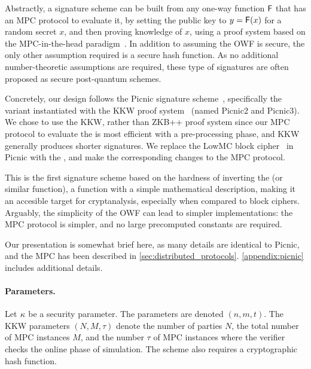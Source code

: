 Abstractly, a signature scheme can be built from any one-way function $\mathsf{F}$
that has an MPC protocol to evaluate it, by setting the public key to $y =
\mathsf{F}(x)$ for a random secret $x$, and then proving knowledge of $x$, using a
proof system based on the MPC-in-the-head paradigm~\cite{STOC:IKOS07}.  In
addition to assuming the OWF is secure, the only other assumption required is a
secure hash function. As no additional number-theoretic assumptions are
required, these type of signatures are often proposed as secure post-quantum
schemes. 

Concretely, our design follows the Picnic signature scheme~\cite{CCS:CDGORR17},
specifically the variant instantiated with the KKW proof
system~\cite{CCS:KatKolWan18} (named Picnic2 and Picnic3).  We chose to use the
KKW, rather than ZKB++ proof system since our MPC protocol to evaluate the
\ttOWF is most efficient with a pre-processing phase, and KKW generally
produces shorter signatures.  We replace the LowMC block cipher~\cite{albrecht2015-lowmc} in Picnic 
with the \ttOWF, and make the corresponding changes to the MPC protocol. 

This is the first signature scheme based on the hardness of inverting the
\ttOWF (or similar function), a function with a simple mathematical
description, making it an accesible target for cryptanalysis, especially when
compared to block ciphers.  Arguably, the simplicity of the OWF can lead to
simpler implementations: the MPC protocol is simpler, and no large precomputed
constants are required. 

Our presentation is somewhat brief here, as many details are identical to Picnic, 
and the \ttOWF MPC has been described in \cref{sec:distributed_protocols}. \cref{appendix:picnic}
includes additional details. 

\paragraph{Parameters.} Let $\kappa$ be a security parameter.  The
\ttOWF parameters are denoted $(n, m, t)$.  The KKW parameters $(N, M,
\tau)$ denote the number of parties $N$, the total number of MPC instances $M$,
and the number $\tau$ of MPC instances where the verifier checks the online
phase of simulation.  The scheme also requires a cryptographic hash function. 

